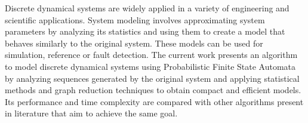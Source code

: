 Discrete dynamical systems are widely applied in a variety of engineering and scientific applications. System modeling involves approximating system parameters by analyzing its statistics and using them to create a model that behaves similarly to the original system. These models can be used for simulation, reference or fault detection. The current work presents an algorithm to model discrete dynamical systems using Probabilistic Finite State Automata by analyzing sequences generated by the original system and applying statistical methods and graph reduction techniques to obtain compact and efficient models. Its performance and time complexity are compared with other algorithms present in literature that aim to achieve the same goal.
